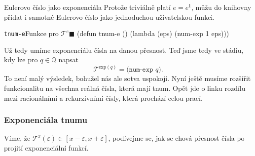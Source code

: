 \begin{myremarkbez}{Eulerovo číslo jako exponenciála}
Protože triviálně platí $e = e^1$, můžu do knihovny přidat i samotné Eulerovo číslo jako jednoduchou uživatelskou funkci.
\begin{lispcode}{\texttt{tnum-e}}{Funkce pro $\mathcal{T}^e$\hfill$\blacksquare$}
(\textcolor{funkcionalni}{defun} \textcolor{pojmenovan}{tnum-e} ()
  (\textcolor{funkcionalni}{lambda} (eps)
    (\textcolor{moje}{num-exp} 1 eps)))
\end{lispcode}
\end{myremarkbez}

Už tedy umíme exponenciálu čísla na danou přesnost. Teď jsme tedy ve stádiu, kdy lze pro $q\in\mathbb{Q}$ napsat
\begin{equation}
\mathcal{T}^{\mathrm{exp}(q)}=\texttt{(num-exp } q \texttt{)}.
\end{equation}
To není malý výsledek, bohužel nás ale sotva uspokojí. Nyní ještě musíme rozšířit funkcionalitu na všechna reálná čísla, která mají tnum. Opět jde o linku rozdílu mezi racionálními a rekurzivními čísly, která prochází celou prací.

\subsubsection{Exponenciála tnumu}
Víme, že $\mathcal{T}^x(\varepsilon) \in [x-\varepsilon,x+\varepsilon]$, podívejme se, jak se chová přesnost čísla po projití exponenciální funkcí.

